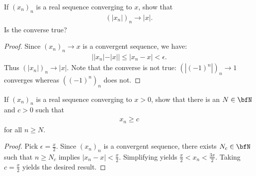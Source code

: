\documentclass[10pt,twoside,openany]{memoir}
\begin{document}
    \begin{exercise}
        If $(x_n)_n$ is a real sequence converging to $x$, show that 
            \begin{equation*}
            \begin{split}
                (|x_n|)_n \rightarrow |x|.
            \end{split}
            \end{equation*}
        Is the converse true?
    \end{exercise}
        {\color{red} \begin{proof}
            Since $(x_n)_n \rightarrow x$ is a convergent sequence, we have:
                \begin{equation*}
                \begin{split}
                    ||x_n| - |x|| \leq |x_n - x| < \epsilon.
                \end{split}
                \end{equation*}
            Thus $(|x_n|)_n \rightarrow |x|$. Note that the converse is not true: $(|(-1)^n|)_n \rightarrow 1$ converges whereas $((-1)^n)_n$ does not. 
        \end{proof}}
    \begin{exercise}
        If $(x_n)_n$ is a real sequence converging to $x>0$, show that there is an $N \in \bfN$ and $c>0$ such that
            \begin{equation*}
            \begin{split}
                x_n \geq c
            \end{split}
            \end{equation*}
        for all $n \geq N$.
    \end{exercise}
        {\color{red} \begin{proof}
            Pick $\epsilon = \frac{x}{2}$. Since $(x_n)_n$ is a convergent sequence, there exists $N_c \in \bfN$ such that $n \geq N_c$ implies $|x_n - x| < \frac{x}{2}$. Simplifying yields $\frac{x}{2} < x_n < \frac{3x}{2}$. Taking $c = \frac{x}{2}$ yields the desired result.
        \end{proof}}
\end{document}
